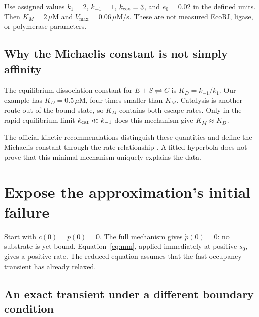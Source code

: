 
Use assigned values $k_1=2$, $k_{-1}=1$, $k_{\rm cat}=3$, and $e_0=0.02$ in the defined units. Then $K_M=2\,\mu$M and $V_{\max}=0.06\,\mu$M/s. These are not measured EcoRI, ligase, or polymerase parameters.

\begin{center}\end{center}


\subsection{Why the Michaelis constant is not simply affinity}

The equilibrium dissociation constant for $E+S\rightleftharpoons C$ is $K_D=k_{-1}/k_1$. Our example has $K_D=0.5\,\mu$M, four times smaller than $K_M$. Catalysis is another route out of the bound state, so $K_M$ contains both escape rates. Only in the rapid-equilibrium limit $k_{\rm cat}\ll k_{-1}$ does this mechanism give $K_M\approx K_D$.

The official kinetic recommendations distinguish these quantities and define the Michaelis constant through the rate relationship \cite{IUBMB1981}. A fitted hyperbola does not prove that this minimal mechanism uniquely explains the data.

\section{Expose the approximation's initial failure}

Start with $c(0)=p(0)=0$. The full mechanism gives $\dot p(0)=0$: no substrate is yet bound. Equation~\ref{eq:mm}, applied immediately at positive $s_0$, gives a positive rate. The reduced equation assumes that the fast occupancy transient has already relaxed.

\subsection{An exact transient under a different boundary condition}

